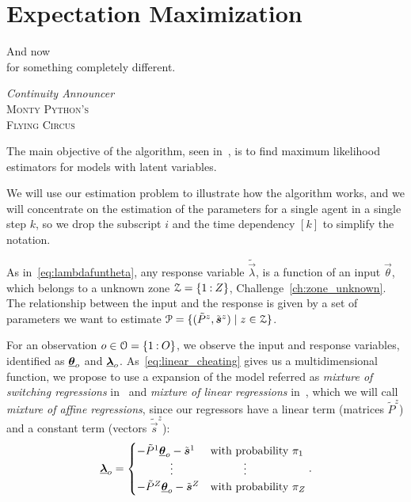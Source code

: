 \documentclass[../main.tex]{subfiles}
\begin{document}
\chapter{Expectation Maximization}
\epigraph{\centering And now\\ for something completely different.}
{\textit{Continuity Announcer}\\\textsc{Monty Python's\\ Flying Circus}}
\minitoc
\label{sec:expect-maxim-algo}

The main objective of the \EM{} algorithm, seen in~\cite{DempsterEtAl1977}, is to find maximum likelihood estimators for models with latent variables.

We will use our estimation problem to illustrate how the algorithm works, and
we will concentrate on the estimation of the parameters for a single agent in a single step $k$, so we drop the subscript $i$ and the time dependency $[k]$ to simplify the notation.

As in~\eqref{eq:lambdafuntheta},  any response variable $\tilde{\vec{\lambda}}$, is a function of an input $\vec{\theta}$, which belongs to a unknown zone ${\mathcal{Z}=\{1\mathbin{:}Z\}}$, Challenge~\ref{ch:zone_unknown}.
The relationship between the input and the response is given by a set of parameters we want to estimate ${\mathcal{P}=\{(\tilde{P}^{z},\tilde{\boldsymbol{s}}^{z})\mid z\in\mathcal{Z}\}}$.

For an observation ${o\in\mathcal{O}=\{1\mathbin{:}O\}}$, we observe the input and response variables, identified as  ${\underline{\boldsymbol{\theta}}_{o}}$ and ${\underline{\boldsymbol{\lambda}}_{o}}$.
As~\eqref{eq:linear_cheating} gives us a multidimensional \pwa{} function, we propose to use a expansion of the model referred as \emph{mixture of switching regressions} in~\cite{QuandtRamsey1978} and \emph{mixture of linear regressions} in~\cite{FariaSoromenho2010}, which we will call \emph{mixture of affine regressions}, since our regressors have a linear term (matrices $\tilde{P}^{z}$) and a constant term (vectors $\tilde{\vec{s}}^{z}$):
\begin{equation}
  \label{eq:linear_cheating_random}
  \randomvec{\lambda}_{o}=
  \begin{cases}
    -\tilde{P}^{1}\randomvec{\theta}_{o}-\tilde{\vec{s}}^{1}&\text{with probability}\ \pi_{1} \\
    \qquad\quad \vdots&\qquad\quad \vdots\\
    -\tilde{P}^{Z}\randomvec{\theta}_{o}-\tilde{\vec{s}}^{Z}&\text{with probability}\ \pi_{Z} \\
  \end{cases}.
\end{equation}
\end{document}
